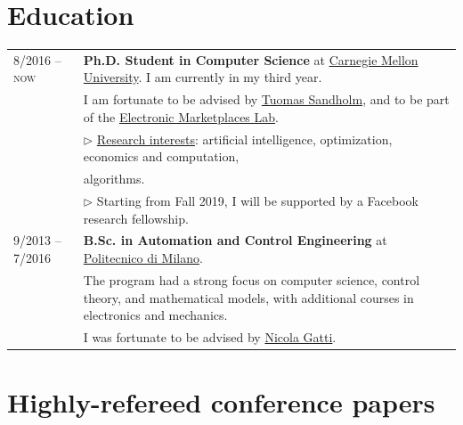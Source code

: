 \documentclass[10PT,letter]{article}
\newcommand{\equalcontrib}{$^*$}
\newcommand{\numbox}[1]{} %
\begin{document}
     \section*{\numbox{2}\bfseries\textcolor{titlecol}{\sffamily Education}}
        \begin{tabular}{lp{5.45in}}
            \textsc{8/2016 -- now} & \textbf{Ph.D. Student in Computer Science} at \href{www.cmu.edu}{Carnegie Mellon University}. I am currently in my third year.\\[.5mm]
            & I am fortunate to be advised by \href{http://cs.cmu.edu/~sandholm}{Tuomas Sandholm}, and to be part of the \href{http://www.cs.cmu.edu/~amem/}{Electronic Marketplaces Lab}.\\[1.1mm]
            & $\triangleright$ {\underline{Research interests}}: artificial intelligence, optimization, economics and computation,\\
            &\hspace{3.31cm}algorithms.\\[1.5mm]
            & $\triangleright$ Starting from Fall 2019, I will be supported by a Facebook research fellowship.\\[4mm]
            \textsc{9/2013 -- 7/2016} & \textbf{B.Sc. in Automation and Control Engineering} at \href{http://www.polimi.it/en/english-version/}{Politecnico di Milano}.\\[.5mm]
            & The program had a strong focus on computer science, control theory, and mathematical models, with additional courses in electronics and mechanics.\\[.5mm]
            & I was fortunate to be advised by \href{http://www.gametheory.polimi.it/nicola-gatti.html}{Nicola Gatti}.\\[3mm]
        \end{tabular}

        \renewcommand{\thefootnote}{\equalcontrib}
        \renewcommand{\thefootnote}{\arabic{footnote}}
            
    \section*{\numbox{3}\bfseries\textcolor{titlecol}{\sffamily Highly-refereed conference papers }}
        
\end{document}
